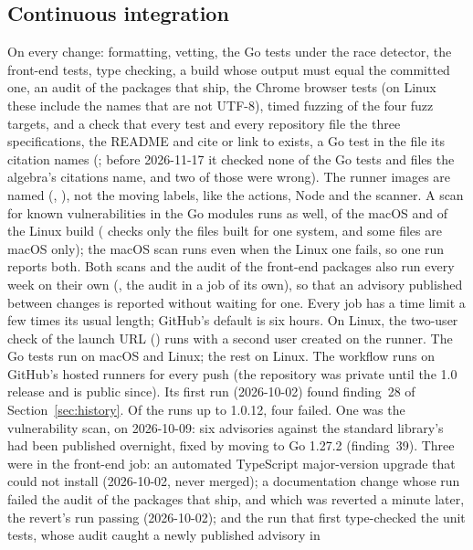\subsection{Continuous integration}

On every change: formatting, vetting, the Go tests under the race detector, the front-end
tests, type checking, a build whose output must equal the committed one, an audit of the
packages that ship, the Chrome browser tests (on Linux these include the names that are not
UTF-8), timed fuzzing of the four fuzz targets, and a check that every test and every repository file the three
specifications, the README and  cite or link to exists, a Go test in the
file its citation names
(; before 2026-11-17 it checked none of the Go tests
and files the algebra's citations name, and two of those were wrong).
The runner images are named (, ), not the moving
 labels, like the actions, Node and the scanner.
A scan for known vulnerabilities in the Go modules runs as well, of the macOS and of the
Linux build ( checks only the files built for one system, and some files
are macOS only); the macOS scan runs even when the Linux one fails, so one run reports
both.  Both scans and the audit of the front-end packages also run every week on their
own (, the audit in a job of its own), so that an advisory published
between changes is reported without waiting for one.  Every job has a time limit a few
times its usual length; GitHub's default is six hours.  On Linux, the two-user check of the launch URL
() runs with a second user created on the runner.  The Go tests
run on macOS and Linux; the rest on Linux.  The workflow runs on GitHub's hosted runners for every push
(the repository was private until the 1.0 release and is public since).  Its first run
(2026-10-02) found finding~28 of Section~\ref{sec:history}.  Of the runs up to 1.0.12, four
failed.  One was the vulnerability scan, on 2026-10-09: six advisories against the
standard library's  had been published overnight, fixed by moving to Go
1.27.2 (finding~39).  Three were in the front-end job: an automated TypeScript major-version upgrade that
 could not install (2026-10-02, never merged); a documentation change whose
run failed the audit of the packages that ship, and which was reverted a minute later, the
revert's run passing (2026-10-02); and the run that first type-checked the unit tests,
whose audit caught a newly published advisory in 
